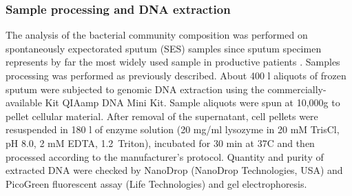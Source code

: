 \subsubsection{Sample processing and DNA extraction} 
The analysis of the bacterial community composition was performed on spontaneously expectorated sputum (SES) samples since sputum specimen represents by far the most widely used sample in productive patients \cite{rogers2010comparing}. Samples processing was performed as previously described. About 400 {\textmu}l aliquots of frozen sputum were subjected to genomic DNA extraction using the commercially-available Kit QIAamp DNA Mini Kit. Sample aliquots were spun at 10,000{\texttimes}g to pellet cellular material. After removal of the supernatant, cell pellets were resuspended in 180 {\textmu}l of enzyme solution (20 mg/ml lysozyme in 20 mM Tris{\textperiodcentered}Cl, pH 8.0, 2 mM EDTA, 1.2\  Triton), incubated for 30 min at 37{\textdegree}C and then processed according to the manufacturer's protocol. Quantity and purity of extracted DNA were checked by NanoDrop (NanoDrop Technologies, USA) and PicoGreen fluorescent assay (Life Technologies) and gel electrophoresis.\\

